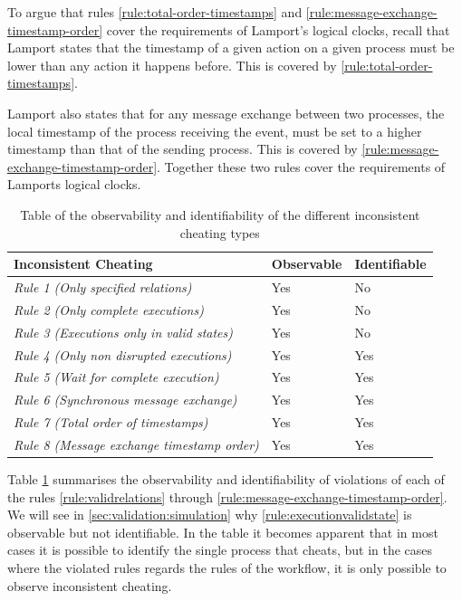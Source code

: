	\newpar To argue that rules \ref{rule:total-order-timestamps} and \ref{rule:message-exchange-timestamp-order} cover the requirements of Lamport's logical clocks, recall that Lamport states that the timestamp of a given action on a given process must be lower than any action it happens before. This is covered by \autoref{rule:total-order-timestamps}.
	
	Lamport also states that for any message exchange between two processes, the local timestamp of the process receiving the event, must be set to a higher timestamp than that of the sending process. This is covered by \autoref{rule:message-exchange-timestamp-order}. Together these two rules cover the requirements of Lamports logical clocks.
	
	\begin{table}[H]
		\centering
		\begin{tabularx}{\textwidth}{Xll}
			\textbf{Inconsistent Cheating} & \textbf{Observable} & \textbf{Identifiable} \\\hline
			\textit{Rule 1 (Only specified relations)}         & Yes          & No            \\
			\textit{Rule 2 (Only complete executions)}         & Yes          & No            \\
			\textit{Rule 3 (Executions only in valid states)}  & Yes          & No            \\
			\textit{Rule 4 (Only non disrupted executions)}    & Yes          & Yes            \\
			\textit{Rule 5 (Wait for complete execution)}      & Yes          & Yes            \\
			\textit{Rule 6 (Synchronous message exchange)}     & Yes          & Yes            \\
			\textit{Rule 7 (Total order of timestamps)}        & Yes          & Yes            \\
			\textit{Rule 8 (Message exchange timestamp order)} & Yes          & Yes           
		\end{tabularx}
		\caption{Table of the observability and identifiability of the different inconsistent cheating types}
		\label{table:inconsistent-cheating-properties}
	\end{table}
	
	\noindent Table \ref{table:inconsistent-cheating-properties} summarises the observability and identifiability of violations of each of the rules \ref{rule:validrelations} through \ref{rule:message-exchange-timestamp-order}. We will see in \autoref{sec:validation:simulation} why \autoref{rule:executionvalidstate} is observable but not identifiable. In the table it becomes apparent that in most cases it is possible to identify the single process that cheats, but in the cases where the violated rules regards the rules of the workflow, it is only possible to observe inconsistent cheating.
	

